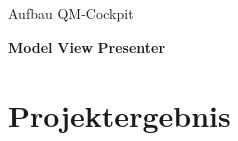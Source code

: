 \begin{frame}{Aufbau QM-Cockpit}
\begin{overlayarea}{\textwidth}{.67\textheight}
 \end{overlayarea}
 \begin{block}{\textbf<2>{Model} \textbf<3>{View} \textbf<4>{Presenter}}\end{block}
\end{frame}

\section{Projektergebnis}
